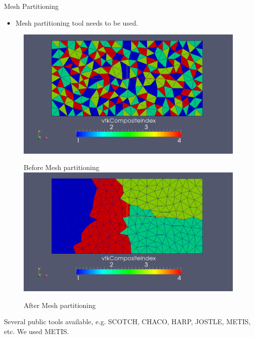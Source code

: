\documentclass[t,english]{beamer}
\begin{document}
\begin{frame}{Mesh Partitioning}
\begin{itemize}
\item Mesh partitioning tool needs to be used. 
\end{itemize}
\begin{figure}[!htb]
\centering
{}
\centering
\includegraphics[scale=0.12]{./beforePartition.png}

Before Mesh partitioning
\endminipage\hfill
\centering
{}
\centering
\includegraphics[scale=0.12]{./afterPartition.png}

After Mesh partitioning
\endminipage\hfill
\end{figure}
Several public tools available, e.g. SCOTCH, CHACO, HARP, JOSTLE, METIS, etc. We used METIS.
\end{frame}
\end{document}
